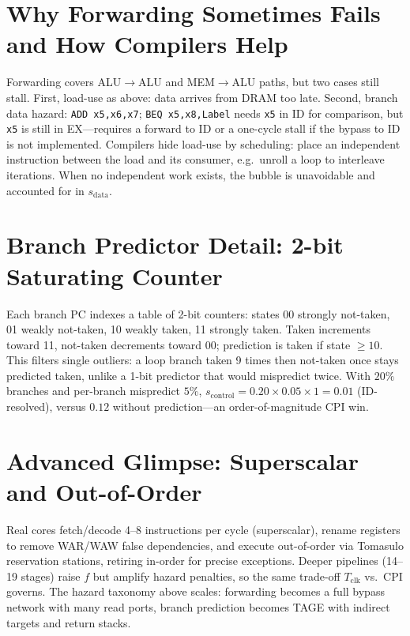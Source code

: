 \section{Why Forwarding Sometimes Fails and How Compilers Help}
Forwarding covers ALU$\to$ALU and MEM$\to$ALU paths, but two cases still stall. First, load-use as above: data arrives from DRAM too late. Second, branch data hazard: \texttt{ADD x5,x6,x7}; \texttt{BEQ x5,x8,Label} needs \texttt{x5} in ID for comparison, but \texttt{x5} is still in EX---requires a forward to ID or a one-cycle stall if the bypass to ID is not implemented. Compilers hide load-use by scheduling: place an independent instruction between the load and its consumer, e.g.\ unroll a loop to interleave iterations. When no independent work exists, the bubble is unavoidable and accounted for in $s_{\text{data}}$.

\section{Branch Predictor Detail: 2-bit Saturating Counter}
Each branch PC indexes a table of 2-bit counters: states 00 strongly not-taken, 01 weakly not-taken, 10 weakly taken, 11 strongly taken. Taken increments toward 11, not-taken decrements toward 00; prediction is taken if state $\ge10$. This filters single outliers: a loop branch taken 9 times then not-taken once stays predicted taken, unlike a 1-bit predictor that would mispredict twice. With $20\%$ branches and per-branch mispredict $5\%$, $s_{\text{control}}=0.20\times0.05\times1=0.01$ (ID-resolved), versus $0.12$ without prediction---an order-of-magnitude CPI win.

\section{Advanced Glimpse: Superscalar and Out-of-Order}
Real cores fetch/decode 4--8 instructions per cycle (superscalar), rename registers to remove WAR/WAW false dependencies, and execute out-of-order via Tomasulo reservation stations, retiring in-order for precise exceptions. Deeper pipelines (14--19 stages) raise $f$ but amplify hazard penalties, so the same trade-off $T_{\text{clk}}$ vs.\ CPI governs. The hazard taxonomy above scales: forwarding becomes a full bypass network with many read ports, branch prediction becomes TAGE with indirect targets and return stacks.

